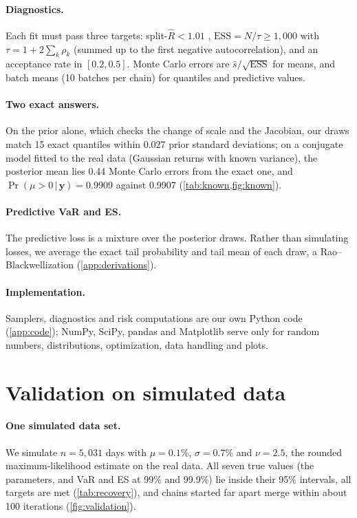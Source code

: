 \documentclass[12pt]{article}
\newcommand{\by}{\mathbf{y}}
\newcommand{\given}{\,\vert\,}
\begin{document}
\paragraph{Diagnostics.} Each fit must pass three targets: split-$\hat R < 1.01$ \cite{vehtari2021rank}, $\mathrm{ESS} = N/\tau \ge 1{,}000$ with $\tau = 1 + 2\sum_k \rho_k$ (summed up to the first negative autocorrelation), and an acceptance rate in $[0.2, 0.5]$. Monte Carlo errors are $\hat{s}/\sqrt{\mathrm{ESS}}$ for means, and batch means (10 batches per chain) for quantiles and predictive values.

\paragraph{Two exact answers.} On the prior alone, which checks the change of scale and the Jacobian, our draws match 15 exact quantiles within 0.027 prior standard deviations; on a conjugate model fitted to the real data (Gaussian returns with known variance), the posterior mean lies 0.44 Monte Carlo errors from the exact one, and $\Pr(\mu > 0 \given \by) = 0.9909$ against 0.9907 (\cref{tab:known,fig:known}).

\paragraph{Predictive VaR and ES.} The predictive loss is a mixture over the posterior draws. Rather than simulating losses, we average the exact tail probability and tail mean of each draw, a Rao--Blackwellization (\cref{app:derivations}).

\paragraph{Implementation.} Samplers, diagnostics and risk computations are our own Python code (\cref{app:code}); NumPy, SciPy, pandas and Matplotlib serve only for random numbers, distributions, optimization, data handling and plots.

\section{Validation on simulated data}\label{sec:validation}

\paragraph{One simulated data set.} We simulate $n = 5{,}031$ days with $\mu = 0.1\%$, $\sigma = 0.7\%$ and $\nu = 2.5$, the rounded maximum-likelihood estimate on the real data. All seven true values (the parameters, and VaR and ES at 99\% and 99.9\%) lie inside their 95\% intervals, all targets are met (\cref{tab:recovery}), and chains started far apart merge within about 100 iterations (\cref{fig:validation}).
\end{document}
